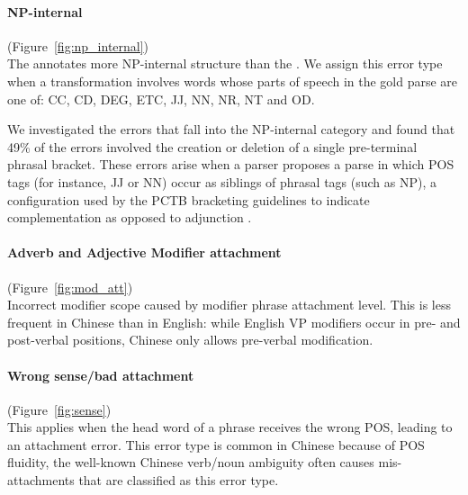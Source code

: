 \begin{figure}
\begin{minipage}[b]{0.45\textwidth}
\centering

\end{minipage}\hfill
\begin{minipage}[b]{0.5\textwidth}
\centering

\end{minipage}
\end{figure}

\paragraph{NP-internal} (Figure~\ref{fig:np_internal}) \\
The \pctb annotates more NP-internal structure than the \ptb.
We assign this error type when a transformation involves words whose parts of speech in the gold parse are one of: CC, CD, DEG, ETC, JJ, NN, NR, NT and OD.

We investigated the errors that fall into the NP-internal category and found that 49\% of the errors involved the creation or deletion of a single pre-terminal phrasal bracket.
These errors arise when a parser proposes a parse in which POS tags (for instance, JJ or NN) occur as siblings of phrasal tags (such as NP), a configuration used by the PCTB bracketing guidelines to indicate complementation as opposed to adjunction \parencite{Xue:2005:NLE}.

\paragraph{Adverb and Adjective Modifier attachment} (Figure~\ref{fig:mod_att}) \\
Incorrect modifier scope caused by modifier phrase attachment level.
This is less frequent in Chinese than in English: while English VP modifiers occur in pre- and post-verbal positions, Chinese only allows pre-verbal modification.

\paragraph{Wrong sense/bad attachment} (Figure~\ref{fig:sense}) \\
This applies when the head word of a phrase receives the wrong POS, leading to an attachment error.
This error type is common in Chinese because of POS fluidity, \myeg the well-known Chinese verb/noun ambiguity often causes mis-attachments that are classified as this error type.

